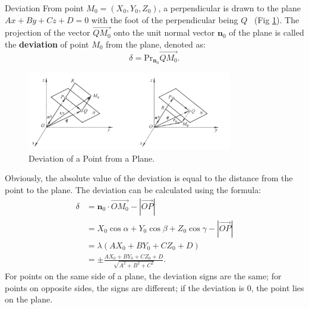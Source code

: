 \documentclass[11pt]{../../TexTemplate/elegantbook} %
\begin{document}
\begin{definition}{Deviation}
    From point \(M_{0} = (X_{0}, Y_{0}, Z_{0})\), 
    a perpendicular is drawn to the plane \(A x + B y + C z + D = 0\) with the foot of the perpendicular being \(Q\)
    ~(Fig \ref{fig:DeviationOfPointFromPlane}). 
    The projection of the vector \(\vec{QM_{0}}\) onto the unit normal vector \(\mathbf{n}_{0}\) of the plane 
    is called the \textbf{deviation} of point \(M_{0}\) from the plane, 
    denoted as: 
    \[
    \delta = \mathrm{Pr}_{\mathbf{n}_{0}} \vec{QM_{0}}.
    \]
\end{definition}
\begin{figure}[h]
    \centering
    \includegraphics[width=0.8\textwidth]{img/deviation.png}
    \caption{Deviation of a Point from a Plane.}
    \label{fig:DeviationOfPointFromPlane}
\end{figure}

Obviously, the absolute value of the deviation is equal to the distance from the point to the plane.
The deviation can be calculated using the formula:
\begin{align*}
    \delta &= \mathbf{n}_{0} \cdot \vec{OM_{0}} - |\vec{OP}|\\ 
    &= X_{0}\cos \alpha + Y_{0}\cos \beta + Z_{0}\cos \gamma - |\vec{OP}| \\
    &= \lambda (A X_{0} + B Y_{0} + C Z_{0} + D) \\
    &= \pm \frac{A X_{0} + B Y_{0} + C Z_{0} + D}{\sqrt{A^2 + B^2 + C^2}}.
\end{align*}
For points on the same side of a plane, the deviation signs are the same; 
for points on opposite sides, the signs are different; 
if the deviation is \(0\), the point lies on the plane.
\end{document}
